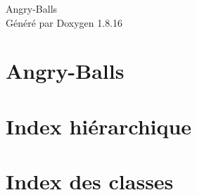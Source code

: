 \let\mypdfximage\pdfximage\def\pdfximage{\immediate\mypdfximage}\documentclass[twoside]{book}
\newcommand{\+}{\discretionary{\mbox{\scriptsize$\hookleftarrow$}}{}{}}
\newcommand{\clearemptydoublepage}{%
  \newpage{\pagestyle{empty}\cleardoublepage}%
}
\begin{document}
\hypersetup{pageanchor=false,
             bookmarksnumbered=true,
             pdfencoding=unicode
            }
\begin{titlepage}
\vspace*{7cm}
\begin{center}%
{\Large Angry-\/\+Balls }\\
\vspace*{1cm}
{\large Généré par Doxygen 1.8.16}\\
\end{center}
\end{titlepage}
\clearemptydoublepage
{}
\tableofcontents
\clearemptydoublepage
{}
\hypersetup{pageanchor=true}

\chapter{Angry-\/\+Balls}
\label{md__r_e_a_d_m_e}

\chapter{Index hiérarchique}

\chapter{Index des classes}

\end{document}

